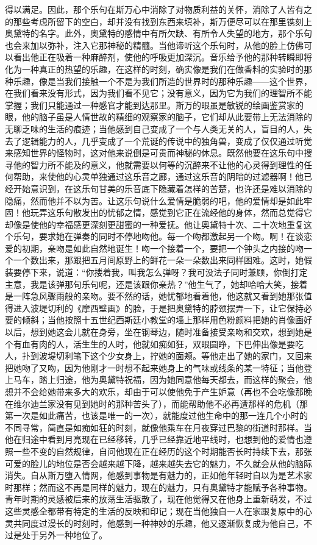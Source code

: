 得以满足。因此，那个乐句在斯万心中消除了对物质利益的关怀，消除了人皆有之的那些考虑所留下的空白，却并没有找到东西来填补，斯万便尽可以在那里镌刻上奥黛特的名字。此外，奥黛特的感情中有所欠缺、有所令人失望的地方，那个乐句也会来加以弥补，注入它那神秘的精髓。当他谛听这个乐句时，从他的脸上仿佛可以看出他正在吸着一种麻醉剂，使他的呼吸更加深沉。音乐给予他的那种转瞬即将化为一种真正的热望的乐趣，在这样的时刻，确实像是我们在做香料的实验时的那种乐趣，像是当我们接触一个不是为我们所造的世界时的那种乐趣——这个世界，在我们看来没有形式，因为我们看不见它；没有意义，因为它为我们的理智所不能掌握；我们只能通过一种感官才能到达那里。斯万的眼虽是敏锐的绘画鉴赏家的眼，他的脑子虽是人情世故的精细的观察家的脑子，它们却从此要带上无法消除的无聊乏味的生活的痕迹；当他感到自己变成了一个与人类无关的人，盲目的人，失去了逻辑能力的人，几乎变成了一个荒诞的传说中的独角兽，变成了仅仅通过听觉来感知世界的怪物时，这对他来说倒是可贵而神秘的休息。既然他要在这乐句中搜寻他的智力所不能及的意义，他就需要以何等的沉醉来不让他的心灵得到理性的任何帮助，来使他的心灵单独通过这乐音之廊，通过这乐音的阴暗的过滤器啊！他已经开始意识到，在这乐句甘美的乐音底下隐藏着怎样的苦楚，也许还是难以消除的隐痛，然而他并不以为苦。让这乐句说什么爱情是脆弱的吧，他的爱情却是如此牢固！他玩弄这乐句散发出的忧郁之情，感觉到它正在流经他的身体，然而总觉得它却像是使他的幸福感更深刻更甜蜜的一种爱抚。他让奥黛特十次、二十次地重复这个乐句，要求她在弹奏的同时不停地吻他。每一个吻都激起另一个吻。啊！在谈恋爱的初期，亲吻是如此自然地诞生！吻一个接着一个，要把一个钟头之内接的吻一个一个数出来，那跟把五月间原野上的鲜花一朵一朵数出来同样困难。这时，她假装要停下来，说道：“你搂着我，叫我怎么弹呀？我可没法子同时兼顾，你倒打定主意，我是该弹那句乐句呢，还是该跟你亲热？”他生气了，她却哈哈大笑，接着是一阵急风骤雨般的亲吻。要不然的话，她忧郁地看着他，他这就又看到她那张值得进入波堤切利的《摩西壁画》的脸，于是把奥黛特的脖颈摆弄一下，让它保持必要的倾斜；当他按照十五世纪西斯廷小教堂的墙上那样用色粉颜料把她的肖像画好以后，想到她这会儿就在身旁，坐在钢琴边，随时准备接受亲吻和交欢，想到她是个有血有肉的人，活生生的人时，他就如痴如狂，双眼圆睁，下巴伸出像是要吃人，扑到波堤切利笔下这个少女身上，拧她的面颊。等他走出了她的家门，又回来把她吻了又吻，因为他刚才一时想不起来她身上的气味或线条的某一特征；当他登上马车，踏上归途，他为奥黛特祝福，因为她同意他每天都去，而这样的聚会，他想并不会给她带来多大的欢乐，却由于可以使他免于产生妒意（再也不会吃像那晚在维尔迪兰家没有见到她时的那种苦头了），而能帮助他不必再遭那样的危机（那第一次是如此痛苦，也该是唯一的一次），就能度过他生命中的那一连几个小时的不同寻常，简直是如痴如狂的时刻，就像他乘车在月夜穿过巴黎的街道时那样。当他在归途中看到月亮现在已经移转，几乎已经靠近地平线时，也想到他的爱情也遵照一些不变的自然规律，自问他现在正在经历的这个时期能否长时持续下去，那张可爱的脸儿的地位是否会越来越下降，越来越失去它的魅力，不久就会从他的脑际消失。自从斯万堕入情网，他感到事物是有魅力的，正如他年轻时自以为是艺术家时那样；然而这不再是同样的魅力，现在的魅力，只有奥黛特才能赋予各种事物。青年时期的灵感被后来的放荡生活驱散了，现在他觉得又在他身上重新萌发，不过这些灵感全都带有特定的生活的反映和印记；现在当他独自一人在家跟复原中的心灵共同度过漫长的时刻时，他感到一种神妙的乐趣，他又逐渐恢复成为他自己，不过是处于另外一种地位了。
